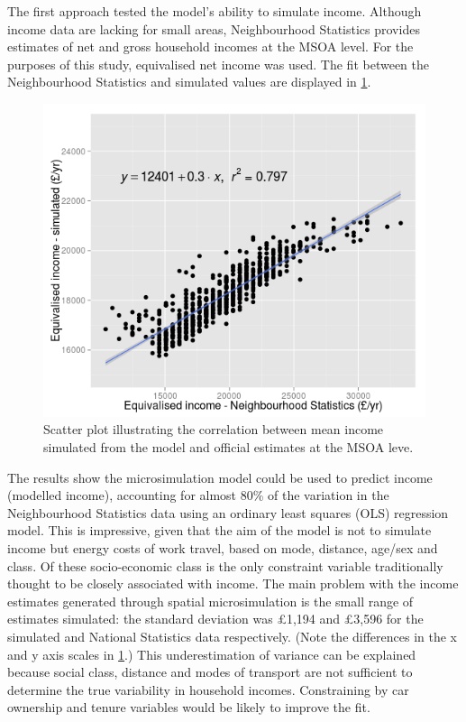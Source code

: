 \documentclass[a4paper, 11pt, twoside]{article}
\begin{document}
The first approach tested the model's ability to simulate income. Although
income data are lacking for small areas, Neighbourhood Statistics
provides estimates of net and gross household incomes at the MSOA level. For the purposes of
this study, equivalised net income was used. The fit between the Neighbourhood
Statistics and simulated values are displayed in \cref{fig:income-test}.

\begin{figure}[h]
 \centering
 \includegraphics[width=12cm]{Income-check-morevars}
\caption[Scatter plot of simulated vs official estimated income]{Scatter plot
illustrating the correlation between mean
income simulated from the model and official estimates at the MSOA
leve.}
 \label{fig:income-test}
\end{figure}

The results show the microsimulation model could be used to predict income
(modelled income), accounting for almost 80\% of the variation in the
Neighbourhood Statistics data using an ordinary least squares (OLS) regression
model.
This is impressive, given that the aim of the model is not to simulate
income but energy costs of work travel, based on mode, distance, age/sex
and class. Of these socio-economic class is the only constraint
variable traditionally thought to be closely associated with income.
The main problem with the income estimates generated through spatial
microsimulation is the small range of estimates simulated:
the standard deviation was
\pounds1,194 and \pounds3,596 for the simulated and National Statistics data
respectively. (Note the
differences in the x and y axis scales in \cref{fig:income-test}.)
This underestimation of variance can be explained because social class,
distance and modes of transport are not sufficient to determine the true
variability in household incomes. Constraining by car ownership and tenure
variables would be likely to improve the fit.
\end{document}
